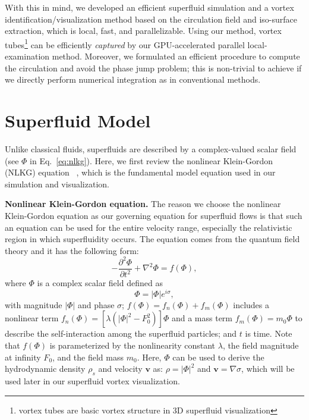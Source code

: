 \documentclass[10pt,journal,compsoc,twoside]{IEEEtran}
\newcommand{\bl}[1]{{\color{black}{#1}}}
\begin{document}
	With this in mind, we developed an efficient superfluid simulation and a vortex identification/visualization method based on the circulation field and iso-surface extraction, which is local, fast, and parallelizable.
	Using our method, vortex tubes\footnote{vortex tubes are basic vortex structure in 3D superfluid visualization} can be efficiently {\em captured} by our GPU-accelerated parallel local-examination method.
	Moreover, we formulated an efficient procedure to compute the circulation and avoid the phase jump problem; this is non-trivial to achieve if we directly perform numerical integration as in conventional methods.
	
	
	\section{Superfluid Model}
	\label{sec:superfluid_fundamentals}
	
	Unlike classical fluids, superfluids are described by a complex-valued scalar field (see $\Phi$ in Eq.~\ref{eq:nlkg}).
	Here, we first review the nonlinear Klein-Gordon (NLKG) equation \bl{derived and formulated in}~\cite{PRD_14}, which is the fundamental model equation used in our simulation and visualization.

	\vspace{0.1cm}
	\noindent
	\textbf{Nonlinear Klein-Gordon equation.}
	The reason we choose the nonlinear Klein-Gordon equation as our governing equation for superfluid flows is that such an equation can be used for the entire velocity range, especially the relativistic region in which superfluidity occurs.
	The equation comes from the quantum field theory and it has the following form:
	\begin{equation} \label{eq:nlkg}
		- \frac{\partial^2 \Phi}{\partial t^2} + \nabla^2 \Phi = f(\Phi),
	\end{equation}
	where 
	$\Phi$ is a complex scalar field defined as
	\begin{equation} \label{eq:def_phi}
		\Phi = |\Phi| e ^ {i\sigma} ,
	\end{equation}
	with magnitude $|\Phi|$ and phase $\sigma$;
	$f(\Phi)=f_n(\Phi)+f_m(\Phi)$ includes a nonlinear term $f_n(\Phi)=[ \lambda ( |\Phi|^2-F_0^2 ) ] \Phi$ and a mass term $f_m(\Phi)=m_0\Phi$ to describe the self-interaction among the superfluid particles; and
	$t$ is time.
	Note that $f(\Phi)$ is parameterized by the nonlinearity constant $\lambda$, the field magnitude at infinity $F_0$, and the field mass $m_0$.
	Here, $\Phi$ can be used to derive the hydrodynamic density $\rho_s$ and velocity $\mathbf{v}$ as: $\rho=|\Phi|^2$ and $\mathbf{v} = \nabla \sigma$,
	which will be used later in our superfluid vortex visualization.
	
\end{document}
